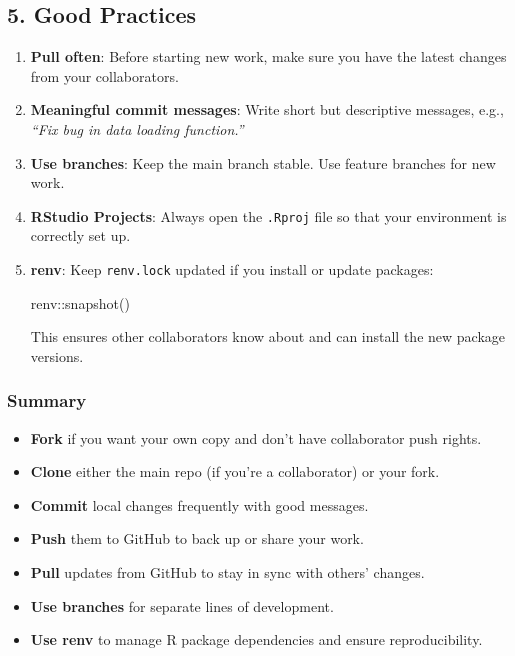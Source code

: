 \documentclass[
  letterpaper,
  DIV=11,
  numbers=noendperiod]{scrartcl}
\newenvironment{Shaded}{\begin{snugshade}}{\end{snugshade}}
\newcommand{\FunctionTok}[1]{\textcolor[rgb]{0.28,0.35,0.67}{#1}}
\newcommand{\NormalTok}[1]{\textcolor[rgb]{0.00,0.23,0.31}{#1}}
\newcommand{\SpecialCharTok}[1]{\textcolor[rgb]{0.37,0.37,0.37}{#1}}
\providecommand{\tightlist}{%
  \setlength{\itemsep}{0pt}\setlength{\parskip}{0pt}}\usepackage{longtable,booktabs,array}
\begin{document}
\subsection{5. Good Practices}\label{good-practices}

\begin{enumerate}
\def\labelenumi{\arabic{enumi}.}
\item
  \textbf{Pull often}: Before starting new work, make sure you have the
  latest changes from your collaborators.\\
\item
  \textbf{Meaningful commit messages}: Write short but descriptive
  messages, e.g., \emph{``Fix bug in data loading function.''}\\
\item
  \textbf{Use branches}: Keep the main branch stable. Use feature
  branches for new work.\\
\item
  \textbf{RStudio Projects}: Always open the \texttt{.Rproj} file so
  that your environment is correctly set up.\\
\item
  \textbf{renv}: Keep \texttt{renv.lock} updated if you install or
  update packages:

\begin{Shaded}
\begin{Highlighting}[]
\NormalTok{renv}\SpecialCharTok{::}\FunctionTok{snapshot}\NormalTok{()}
\end{Highlighting}
\end{Shaded}

  This ensures other collaborators know about and can install the new
  package versions.
\end{enumerate}

\subsubsection{Summary}\label{summary}

\begin{itemize}
\tightlist
\item
  \textbf{Fork} if you want your own copy and don't have collaborator
  push rights.\\
\item
  \textbf{Clone} either the main repo (if you're a collaborator) or your
  fork.\\
\item
  \textbf{Commit} local changes frequently with good messages.\\
\item
  \textbf{Push} them to GitHub to back up or share your work.\\
\item
  \textbf{Pull} updates from GitHub to stay in sync with others'
  changes.\\
\item
  \textbf{Use branches} for separate lines of development.\\
\item
  \textbf{Use renv} to manage R package dependencies and ensure
  reproducibility.
\end{itemize}
\end{document}
